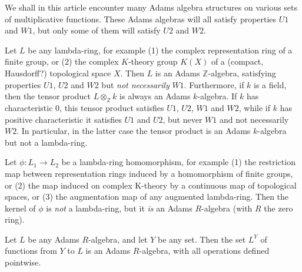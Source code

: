 \begin{remark}
We shall in this article encounter many Adams algebra structures on various sets of multiplicative functions. These Adams algebras will all satisfy properties $U1$ and $W1$, but only some of them will satisfy $U2$ and $W2$.
\end{remark}


\begin{example}
Let $L$ be any lambda-ring, for example (1) the complex representation ring of a finite group, or (2) the complex $K$-theory group $K(X)$ of a (compact, Hausdorff?) topological space $X$. Then $L$ is an Adams $\mathbb{Z}$-algebra, satisfying properties $U1$, $U2$ and $W2$ but \emph{not necessarily} $W1$. Furthermore, if $k$ is a field, then the tensor product $L \otimes_{\mathbb{Z}} k$ is always an Adams $k$-algebra. If $k$ has characteristic 0, this tensor product satisfies $U1$, $U2$, $W1$ and $W2$, while if $k$ has positive characteristic it satisfies $U1$ and $U2$, but never $W1$ and not necessarily $W2$. In particular, in the latter case the tensor product is an Adams $k$-algebra but not a lambda-ring.
\end{example}

\begin{example}
Let $\phi: L_1 \to L_2$ be a lambda-ring homomorphism, for example (1) the restriction map between representation rings induced by a homomorphism of finite groups, or (2) the map induced on complex K-theory by a continuous map of topological spaces, or (3) the augmentation map of any augmented lambda-ring. Then the kernel of $\phi$ is \emph{not} a lambda-ring, but it \emph{is} an Adams $R$-algebra (with $R$ the zero ring). 
\end{example}

\begin{example}
Let $L$ be any Adams $R$-algebra, and let $Y$ be any set. Then the set $L^Y$ of functions from $Y$ to $L$ is an Adams $R$-algebra, with all operations defined pointwise. 
\end{example}

